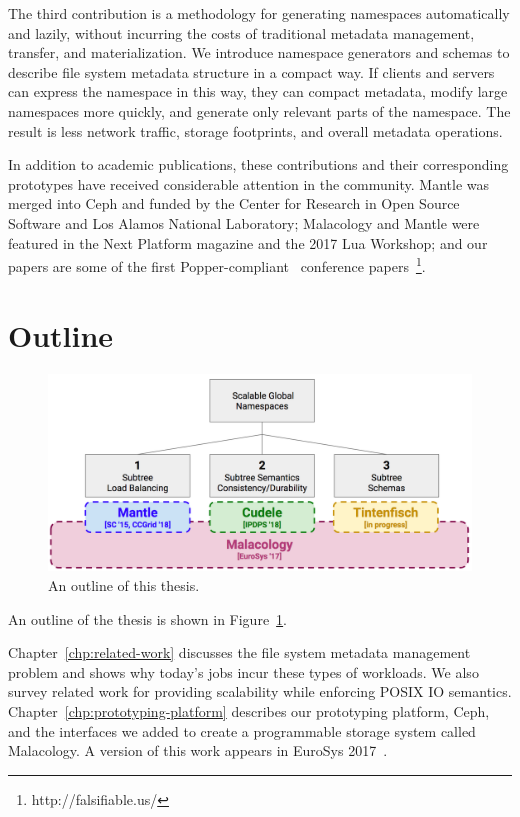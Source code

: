 The third contribution is a methodology for generating namespaces automatically
and lazily, without incurring the costs of traditional metadata management,
transfer, and materialization.  We introduce namespace generators and schemas
to describe file system metadata structure in a compact way. If clients and
servers can express the namespace in this way, they can compact metadata,
modify large namespaces more quickly, and generate only relevant parts of the
namespace. The result is less network traffic, storage footprints, and overall
metadata operations.  

In addition to academic publications, these contributions and their
corresponding prototypes have received considerable attention in the community.
Mantle was merged into Ceph and funded by the Center for Research in Open
Source Software and Los Alamos National Laboratory; Malacology and Mantle were
featured in the Next Platform magazine and the 2017 Lua Workshop; and our
papers are some of the first Popper-compliant~\cite{jimenez:login16-popper,
jimenez:ipdpsw17-popper, jimenez_tackling_2015, jimenez_aver_2016,
jimenez:rr18-popper} conference papers~\footnote{http://falsifiable.us/}.

\section{Outline}

\begin{figure}[tb]
  \centering
  \includegraphics[width=1\textwidth]{./chapters/overview.png}
  \caption{An outline of this thesis.}
  \label{fig:thesis-overview}
\end{figure}

An outline of the thesis is shown in Figure~\ref{fig:thesis-overview}.

Chapter~\ref{chp:related-work} discusses the file system metadata management
problem and shows why today's jobs incur these types of workloads. We also
survey related work for providing scalability while enforcing POSIX IO
semantics. Chapter~\ref{chp:prototyping-platform} describes our prototyping
platform, Ceph, and the interfaces we added to create a programmable storage
system called Malacology. A version of this work appears in EuroSys
2017~\cite{sevilla:eurosys17-malacology}.

